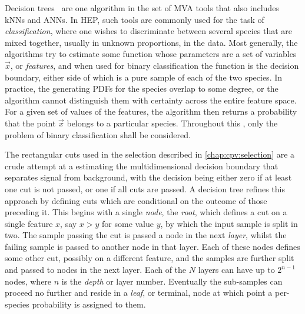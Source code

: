 Decision trees~\cite{breiman1984classification,Louppe:14077502} are one 
algorithm in the set of \acl{MVA} tools that also includes \aclp{kNN} and 
\aclp{ANN}.
In \acl{HEP}, such tools are commonly used for the task of 
\emph{classification}, where one wishes to discriminate between several species 
that are mixed together, usually in unknown proportions, in the data.
Most generally, the algorithms try to estimate some function whose parameters 
are a set of variables $\vec{x}$, or \emph{features}, and when used for binary 
classification the function is the decision boundary, either side of which is a 
pure sample of each of the two species.
In practice, the generating \acp{PDF} for the species overlap to some degree, 
or the algorithm cannot distinguish them with certainty across the entire 
feature space.
For a given set of values of the features, the algorithm then returns a 
probability that the point $\vec{x}$ belongs to a particular species.
Throughout this , only the 
problem of binary classification shall be considered.

The rectangular cuts used in the selection described in 
\cref{chap:cpv:selection} are a crude attempt at a estimating the 
multidimensional decision boundary that separates signal from background, with 
the decision being either zero if at least one cut is not passed, or one if all 
cuts are passed.
A decision tree refines this approach by defining cuts which are conditional on 
the outcome of those preceding it.
This begins with a single \emph{node}, the \emph{root}, which defines a cut on 
a single feature $x$, say $x > y$ for some value $y$, by which the input sample 
is split in two.
The sample passing the cut is passed a node in the next \emph{layer}, whilst 
the failing sample is passed to another node in that layer.
Each of these nodes defines some other cut, possibly on a different feature, 
and the samples are further split and passed to nodes in the next layer.
Each of the $N$ layers can have up to $2^{n - 1}$ nodes, where $n$ is the 
\emph{depth} or layer number.
Eventually the sub-samples can proceed no further and reside in a \emph{leaf}, 
or terminal, node at which point a per-species probability is assigned to them.

